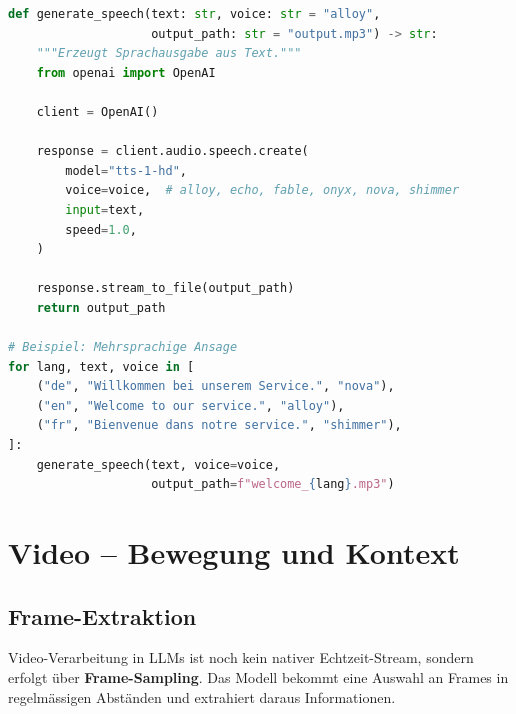 \begin{lstlisting}[language=Python, caption=TTS mit mehreren Stimmen]
def generate_speech(text: str, voice: str = "alloy",
                    output_path: str = "output.mp3") -> str:
    """Erzeugt Sprachausgabe aus Text."""
    from openai import OpenAI

    client = OpenAI()

    response = client.audio.speech.create(
        model="tts-1-hd",
        voice=voice,  # alloy, echo, fable, onyx, nova, shimmer
        input=text,
        speed=1.0,
    )

    response.stream_to_file(output_path)
    return output_path

# Beispiel: Mehrsprachige Ansage
for lang, text, voice in [
    ("de", "Willkommen bei unserem Service.", "nova"),
    ("en", "Welcome to our service.", "alloy"),
    ("fr", "Bienvenue dans notre service.", "shimmer"),
]:
    generate_speech(text, voice=voice,
                    output_path=f"welcome_{lang}.mp3")
\end{lstlisting}


\section{Video -- Bewegung und Kontext}

\subsection{Frame-Extraktion}

Video-Verarbeitung in LLMs ist noch kein nativer Echtzeit-Stream, sondern erfolgt über \textbf{Frame-Sampling}. Das Modell bekommt eine Auswahl an Frames in regelmässigen Abständen und extrahiert daraus Informationen.

